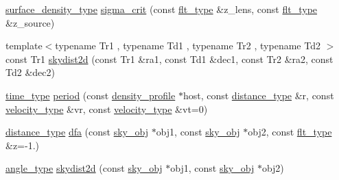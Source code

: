\begin{DoxyCompactItemize}
\item 
\hyperlink{namespaceIceBRG_a80c597ef5ba0a32491d32a9f0083b02d}{surface\-\_\-density\-\_\-type} \hyperlink{namespaceIceBRG_a06ceb81b816047973b849f9d0ed7ab33}{sigma\-\_\-crit} (const \hyperlink{lib_2IceBRG__main_2common_8h_ad0f130a56eeb944d9ef2692ee881ecc4}{flt\-\_\-type} \&z\-\_\-lens, const \hyperlink{lib_2IceBRG__main_2common_8h_ad0f130a56eeb944d9ef2692ee881ecc4}{flt\-\_\-type} \&z\-\_\-source)
\item 
{\footnotesize template$<$typename Tr1 , typename Td1 , typename Tr2 , typename Td2 $>$ }\\const Tr1 \hyperlink{namespaceIceBRG_ad7a84367f7e6f0d26e5c47b9b6acdc88}{skydist2d} (const Tr1 \&ra1, const Td1 \&dec1, const Tr2 \&ra2, const Td2 \&dec2)
\item 
\hyperlink{namespaceIceBRG_abf6c442a2e180ef52c5cefe18e47c327}{time\-\_\-type} \hyperlink{namespaceIceBRG_a2fbc1704fd1ae8dadb77e9b1d45f7c0d}{period} (const \hyperlink{classIceBRG_1_1density__profile}{density\-\_\-profile} $\ast$host, const \hyperlink{namespaceIceBRG_a45499647eb87e24c10ab32c628711cec}{distance\-\_\-type} \&r, const \hyperlink{namespaceIceBRG_a34f8ef3b46f3408301e3c28197095eff}{velocity\-\_\-type} \&vr, const \hyperlink{namespaceIceBRG_a34f8ef3b46f3408301e3c28197095eff}{velocity\-\_\-type} \&vt=0)
\item 
\hyperlink{namespaceIceBRG_a45499647eb87e24c10ab32c628711cec}{distance\-\_\-type} \hyperlink{namespaceIceBRG_a064d602ab6df82494989acf2e37ec0e1}{dfa} (const \hyperlink{classIceBRG_1_1sky__obj}{sky\-\_\-obj} $\ast$obj1, const \hyperlink{classIceBRG_1_1sky__obj}{sky\-\_\-obj} $\ast$obj2, const \hyperlink{lib_2IceBRG__main_2common_8h_ad0f130a56eeb944d9ef2692ee881ecc4}{flt\-\_\-type} \&z=-\/1.)
\item 
\hyperlink{namespaceIceBRG_a688eeb0811a2474b20b667ed2e9625a1}{angle\-\_\-type} \hyperlink{namespaceIceBRG_a224102b59de2be94e8a53cfe8292a534}{skydist2d} (const \hyperlink{classIceBRG_1_1sky__obj}{sky\-\_\-obj} $\ast$obj1, const \hyperlink{classIceBRG_1_1sky__obj}{sky\-\_\-obj} $\ast$obj2)
\end{DoxyCompactItemize}
